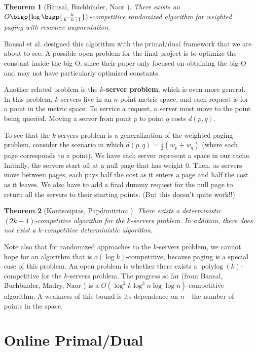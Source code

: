 \documentclass[11pt]{article}
\def\on{\operatorname}
\newtheorem{theorem}{Theorem}
\begin{document}
\begin{theorem}[Bansal, Buchbinder, Naor \cite{Bansal07}]
  There exists an $O\bigp{\log\bigp{\frac{k}{k-h+1}}}$-competitive randomized algorithm for weighted paging with resource augmentation.
\end{theorem}

Bansal et al. designed this algorithm with the primal/dual framework that we are about to see. A possible open problem for the final project is to optimize the constant inside the big-O, since their paper only focused on obtaining the big-O and may not have particularly optimized constants.

Another related problem is the \textbf{$k$-server problem}, which is even more general. In this problem, $k$ servers live in an $n$-point metric space, and each request is for a point in the metric space. To service a request, a server must move to the point being queried. Moving a server from point $p$ to point $q$ costs $d(p,q)$.

To see that the $k$-servers problem is a generalization of the weighted paging problem, consider the scenario in which $d(p,q) = \frac 12(w_p + w_q)$ (where each page corresponds to a point). We have each server represent a space in our cache. Initially, the servers start off at a null page that has weight $0$. Then, as servers move between pages, each pays half the cost as it enters a page and half the cost as it leaves. We also have to add a final dummy request for the null page to return all the servers to their starting points. (But this doesn't quite work!!)

\begin{theorem}[Koutsoupias, Papdimitriou \cite{Koutsoup}]
  There exists a deterministic $(2k-1)$-competitive algorithm for the $k$-servers problem. In addition, there does not exist a $k$-competitive deterministic algorithm.
\end{theorem}

Note also that for randomized approaches to the $k$-servers problem, we cannot hope for an algorithm that is $o(\log k)$-competitive, because paging is a special case of this problem. An open problem is whether there exists a $\on{polylog}(k)$-competitive for the $k$-servers problem. The progress so far (from Bansal, Buchbinder, Madry, Naor \cite{Bansal15}) is a $O(\log^2 k\log^3 n\log\log n)$-competitive algorithm. A weakness of this bound is its dependence on $n$---the number of points in the space.

\section{Online Primal/Dual}
\end{document}
